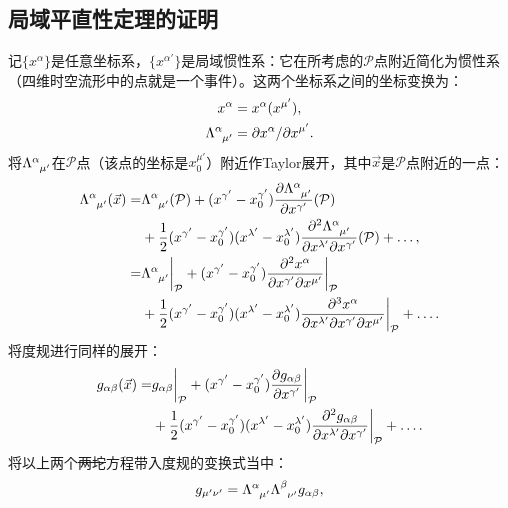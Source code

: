 \subsection*{局域平直性定理的证明}
记$\{ x^\alpha \}$是任意坐标系，$\{ x^{\alpha'}\}$是局域惯性系：它在所考虑的$\mathcal{P}$点附近简化为惯性系（四维时空流形中的点就是一个事件）。这两个坐标系之间的坐标变换为：
\begin{align}
    x^\alpha &= x^\alpha (x^{\mu'}), \label{equ6.21} \\
    \Lambda\indices{^\alpha_{\mu'}} &= \partial x^\alpha / \partial x^{\mu'}. \label{equ6.22}
\end{align}
将$\Lambda\indices{^\alpha_{\mu'}}$在$\mathcal{P}$点（该点的坐标是$x_0^{\mu'}$）附近作Taylor展开，其中$\vec{x}$是$\mathcal{P}$点附近的一点：
\begin{align}
    \Lambda\indices{^\alpha_{\mu'}} (\vec{x}) =& \Lambda\indices{^\alpha_{\mu'}} (\mathcal{P}) + (x^{\gamma'} - x_0^{\gamma'}) \frac{\partial \Lambda\indices{^\alpha_{\mu'}}}{\partial x^{\gamma'}} (\mathcal{P}) \notag \\
    &+ \frac{1}{2} (x^{\gamma'} - x_0^{\gamma'}) (x^{\lambda'} - x_0^{\lambda'}) \frac{ \partial^2 \Lambda\indices{^\alpha_{\mu'}} }{ \partial x^{\lambda'} \partial x^{\gamma'} } (\mathcal{P}) + \dots , \notag \\
    =& \Lambda\indices{^\alpha_{\mu'}}\bigg|_{\mathcal{P}} + (x^{\gamma'} - x_0^{\gamma'} ) \frac{ \partial^2 x^\alpha }{ \partial x^{\gamma'} \partial x^{\mu'} } \bigg|_{\mathcal{P}} \notag \\
    &+ \frac{1}{2} (x^{\gamma'} - x_0^{\gamma'})(x^{\lambda'} - x_0^{\lambda'}) \frac{ \partial^3 x^\alpha }{ \partial x^{\lambda'} \partial x^{\gamma'} \partial x^{\mu'} } \bigg|_{\mathcal{P}} + \dots. \label{equ6.23}
\end{align}
将度规进行同样的展开：
\begin{align}
    g_{\alpha \beta} (\vec{x}) =& g_{\alpha \beta} \bigg|_{\mathcal{P}} + (x^{\gamma'} - x_0^{\gamma'}) \frac{ \partial g_{\alpha \beta} }{ \partial x^{\gamma'} } \bigg|_{\mathcal{P}} \notag \\
    & + \frac{1}{2} (x^{\gamma'} - x_0^{\gamma'}) (x^{\lambda'} - x_0^{\lambda'}) \frac{\partial^2 g_{\alpha \beta}}{\partial x^{\lambda'} \partial x^{\gamma'}} \bigg|_{\mathcal{P}} + \dots. \label{equ6.24}
\end{align}
将以上两个\sout{两坨}方程带入度规的变换式当中：
\begin{equation}
    g_{\mu' \nu'} = \Lambda\indices{^\alpha_{\mu'}} \Lambda\indices{^\beta_{\nu'}} g_{\alpha \beta},
\label{equ6.25}
\end{equation}
